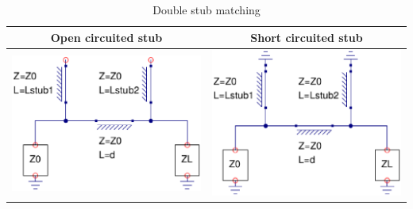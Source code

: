 \begin{table}[H]
  \centering
  \begin{tabular}{ | c | c | }
    \hline
    Open circuited stub & Short circuited stub\\ \hline
    \begin{minipage}{.4\textwidth}
      \includegraphics[width=\linewidth]{DoubleStubOpen}
    \end{minipage}
    &
    \begin{minipage}{.4\textwidth}
      \includegraphics[width=\linewidth]{DoubleStubShort}
    \end{minipage}
    \\ \hline
  \end{tabular}
  \caption{Double stub matching}\label{tbl:dblstub}
\end{table}


